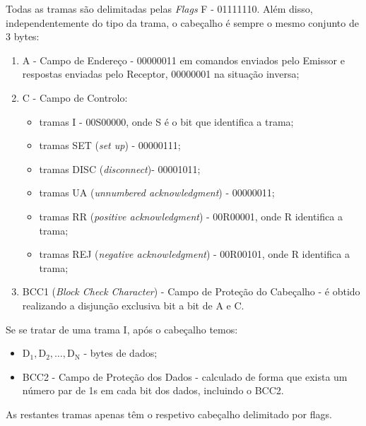 \documentclass[11pt,a4paper,reqno]{report}
\numberwithin{equation}{section}
\begin{document}
\begin{appendices}
Todas as tramas são delimitadas pelas \emph{Flags} F - 01111110. Além disso, independentemente do tipo da trama, o cabeçalho é sempre o mesmo conjunto de 3 bytes:
\begin{enumerate}
	\item A - Campo de Endereço - 00000011 em comandos enviados pelo Emissor e respostas enviadas pelo Receptor, 00000001 na situação inversa;
	\item C - Campo de Controlo:
		\begin{itemize}
			\item tramas I - 00S00000, onde S é o bit que identifica a trama;
			\item tramas SET (\emph{set up}) - 00000111;
			\item tramas DISC (\emph{disconnect})- 00001011;
			\item tramas UA (\emph{unnumbered acknowledgment}) - 00000011;
			\item tramas RR (\emph{positive acknowledgment}) - 00R00001, onde R identifica a trama;
			\item tramas REJ (\emph{negative acknowledgment}) - 00R00101, onde R identifica a trama;
		\end{itemize}
	\item BCC1 (\emph{Block Check Character}) - Campo de Proteção do Cabeçalho - é obtido realizando a disjunção exclusiva bit a bit de A e C.
\end{enumerate} 

Se se tratar de uma trama I, após o cabeçalho temos:
\begin{itemize}
	\item $\text{D}_{\text{1}}, \text{D}_{\text{2}}, \ldots, \text{D}_{\text{N}}$ - bytes de dados;
	\item BCC2 - Campo de Proteção dos Dados - calculado de forma que exista um número par de 1s em cada bit dos dados, incluindo o BCC2.
\end{itemize}

As restantes tramas apenas têm o respetivo cabeçalho delimitado por flags.


\end{appendices}
\end{document}
